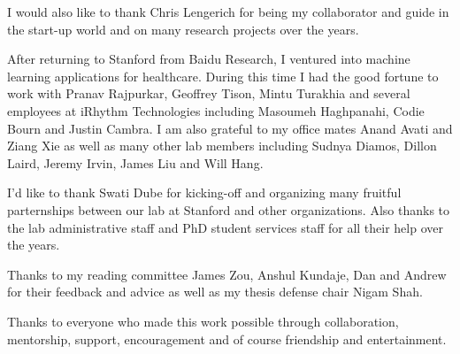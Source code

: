I would also like to thank Chris Lengerich for being my collaborator and guide
in the start-up world and on many research projects over the years.

After returning to Stanford from Baidu Research, I ventured into machine
learning applications for healthcare. During this time I had the good fortune
to work with Pranav Rajpurkar, Geoffrey Tison, Mintu Turakhia and several
employees at iRhythm Technologies including Masoumeh Haghpanahi, Codie Bourn
and Justin Cambra. I am also grateful to my office mates Anand Avati and Ziang
Xie as well as many other lab members including Sudnya Diamos, Dillon Laird,
Jeremy Irvin, James Liu and Will Hang.

I'd like to thank Swati Dube for kicking-off and organizing many fruitful
parternships between our lab at Stanford and other organizations. Also thanks
to the lab administrative staff and PhD student services staff for all their
help over the years.

Thanks to my reading committee James Zou, Anshul Kundaje, Dan and Andrew for
their feedback and advice as well as my thesis defense chair Nigam Shah.

Thanks to everyone who made this work possible through collaboration,
mentorship, support, encouragement and of course friendship and entertainment.

\afterpreface

